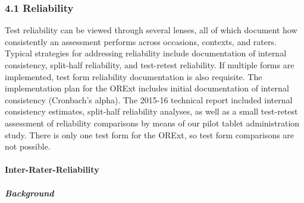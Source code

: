 \documentclass[]{article}
\let\oldparagraph\paragraph
\renewcommand{\paragraph}[1]{\oldparagraph{#1}\mbox{}}
\let\oldsubparagraph\subparagraph
\renewcommand{\subparagraph}[1]{\oldsubparagraph{#1}\mbox{}}
\begin{document}
\subsubsection{4.1 Reliability}\label{reliability}

Test reliability can be viewed through several lenses, all of which
document how consistently an assessment performs across occasions,
contexts, and raters. Typical strategies for addressing reliability
include documentation of internal consistency, split-half reliability,
and test-retest reliability. If multiple forms are implemented, test
form reliability documentation is also requisite. The implementation
plan for the ORExt includes initial documentation of internal
consistency (Cronbach's alpha). The 2015-16 technical report included
internal consistency estimates, split-half reliability analyses, as well
as a small test-retest assessment of reliability comparisons by means of
our pilot tablet administration study. There is only one test form for
the ORExt, so test form comparisons are not possible. \newpage

\paragraph{Inter-Rater-Reliability}\label{inter-rater-reliability}

\subparagraph{Background}\label{background}
\end{document}
